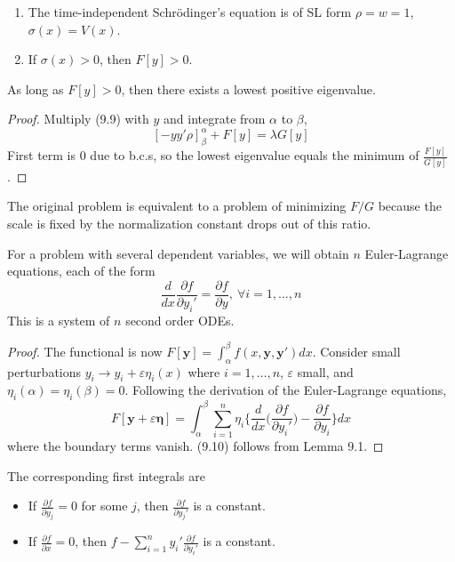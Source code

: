 \documentclass[a4paper]{article}
\begin{document}
\begin{remarks}\leavevmode
\begin{enumerate}
    \item The time-independent Schr\"{o}dinger's equation is of SL form $\rho=w=1$, $\sigma(x)=V(x)$.
    \item If $\sigma(x)>0$, then $F[y]>0$.
\end{enumerate}
\end{remarks}
\begin{prop}
As long as $F[y]>0$, then there exists a lowest positive eigenvalue.
\end{prop}
\begin{proof}
Multiply (9.9) with $y$ and integrate from $\alpha$ to $\beta$,
$$[-yy'\rho]_\beta^\alpha+F[y]=\lambda G[y]$$
First term is 0 due to b.c.s, so the lowest eigenvalue equals the minimum of $\frac{F[y]}{G[y]}$.
\end{proof}
\begin{remarks}
The original problem is equivalent to a problem of minimizing $F/G$ because the scale is fixed by the normalization constant drops out of this ratio.
\end{remarks}
\begin{prop}
For a problem with several dependent variables, we will obtain $n$ Euler-Lagrange equations, each of the form
\begin{equation}
    \frac{d}{dx}\frac{\partial f}{\partial y_i'}=\frac{\partial f}{\partial y},~\forall i=1,\dots, n\tag{9.10}
\end{equation}
This is a system of $n$ second order ODEs.
\end{prop}
\begin{proof}
The functional is now $F[\mathbf{y}]=\int_\alpha^\beta f(x,\mathbf{y},\mathbf{y'})dx$. Consider small perturbations $y_i\rightarrow y_i+\varepsilon\eta_i(x)$ where $i=1,\dots,n$, $\varepsilon$ small, and $\eta_i(\alpha)=\eta_i(\beta)=0$. Following the derivation of the Euler-Lagrange equations,
$$F[\mathbf{y}+\varepsilon\boldsymbol{\eta}]=\int_\alpha^\beta\sum_{i=1}^n\eta_i\bigg\{\frac{d}{dx}\bigg(\frac{\partial f}{\partial y_i'}\bigg)-\frac{\partial f}{\partial y_i}\bigg\}dx$$
where the boundary terms vanish. (9.10) follows from Lemma 9.1.
\end{proof}
\begin{cor}
The corresponding first integrals are
\begin{itemize}
    \item If $\frac{\partial f}{\partial y_j}=0$ for some $j$, then $\frac{\partial f}{\partial y_j'}$ is a constant.
    \item If $\frac{\partial f}{\partial x}=0$, then $f-\sum_{i=1}^ny_i'\frac{\partial f}{\partial y_i'}$ is a constant.
\end{itemize}
\end{cor}
\end{document}
